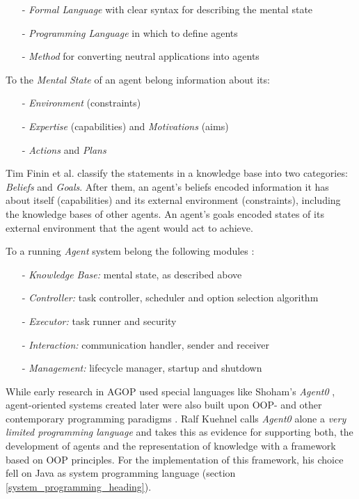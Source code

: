 \begin{enumerate}
    \item[-] \emph{Formal Language} with clear syntax for describing the mental state
    \item[-] \emph{Programming Language} in which to define agents
    \item[-] \emph{Method} for converting neutral applications into agents
\end{enumerate}

To the \emph{Mental State} of an agent belong information \cite{kuehnel} about its:

\begin{itemize}
    \item[-] \emph{Environment} (constraints)
    \item[-] \emph{Expertise} (capabilities) and \emph{Motivations} (aims)
    \item[-] \emph{Actions} and \emph{Plans}
\end{itemize}

Tim Finin et al. \cite{kqml} classify the statements in a knowledge base into
two categories: \emph{Beliefs} and \emph{Goals}. After them, an agent's beliefs
encoded information it has about itself (capabilities) and its external
environment (constraints), including the knowledge bases of other agents. An
agent's goals encoded states of its external environment that the agent would
act to achieve.

To a running \emph{Agent} system belong the following modules \cite{kuehnel}:

\begin{itemize}
    \item[-] \emph{Knowledge Base:} mental state, as described above
    \item[-] \emph{Controller:} task controller, scheduler and option selection algorithm
    \item[-] \emph{Executor:} task runner and security
    \item[-] \emph{Interaction:} communication handler, sender and receiver
    \item[-] \emph{Management:} lifecycle manager, startup and shutdown
\end{itemize}

While early research in AGOP used special languages like Shoham's \emph{Agent0}
\cite{shoham}, agent-oriented systems created later were also built upon OOP-
and other contemporary programming paradigms \cite[p. 237]{kuehnel}. Ralf
Kuehnel \cite{kuehnel} calls \emph{Agent0} alone a \textit{very limited
programming language} and takes this as evidence for supporting both, the
development of agents and the representation of knowledge with a framework based
on OOP principles. For the implementation of this framework, his choice fell on
Java as system programming language (section \ref{system_programming_heading}).

